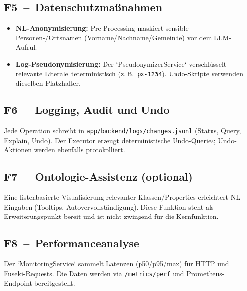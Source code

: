 \subsection*{F5~–~Datenschutzmaßnahmen}
\begin{itemize}
  \item \textbf{NL-Anonymisierung:} Pre-Processing maskiert sensible Personen-/Ortsnamen (Vorname/Nachname/Gemeinde) vor dem LLM-Aufruf.
  \item \textbf{Log-Pseudonymisierung:} Der `PseudonymizerService` verschlüsselt relevante Literale deterministisch (z.\,B.\ \texttt{px-1234}). Undo-Skripte verwenden dieselben Platzhalter.
\end{itemize}

\subsection*{F6~–~Logging, Audit und Undo}
Jede Operation schreibt in \texttt{app/backend/logs/changes.jsonl} (Status, Query, Explain, Undo). Der Executor erzeugt deterministische Undo-Queries; Undo-Aktionen werden ebenfalls protokolliert.

\subsection*{F7~–~Ontologie-Assistenz (optional)}
Eine listenbasierte Visualisierung relevanter Klassen/Properties erleichtert NL-Eingaben (Tooltips, Autovervollständigung). Diese Funktion steht als Erweiterungspunkt bereit und ist nicht zwingend für die Kernfunktion.

\subsection*{F8~–~Performanceanalyse}
Der `MonitoringService` sammelt Latenzen (p50/p95/max) für HTTP und Fuseki-Requests. Die Daten werden via \texttt{/metrics/perf} und Prometheus-Endpoint bereitgestellt.

